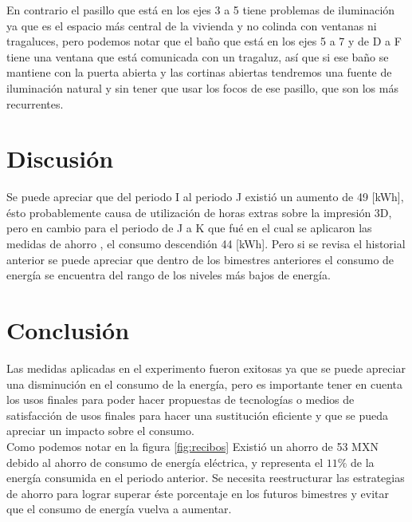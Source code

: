 \documentclass[]{article}
\begin{document}
En contrario el pasillo que está en los ejes 3 a 5 tiene problemas de iluminación ya que es el espacio más central de la vivienda y no colinda con ventanas ni tragaluces, pero podemos notar que el baño que está en los ejes 5 a 7 y de D a F tiene una ventana que está comunicada con un tragaluz, así que si ese baño se mantiene con la puerta abierta y las cortinas abiertas tendremos una fuente de iluminación natural y sin tener que usar los focos de ese pasillo, que son los más recurrentes.\\

\section{Discusión}


Se puede apreciar que del periodo I al periodo J existió un aumento  de 49 [kWh], ésto probablemente causa de utilización de horas extras sobre la impresión 3D, pero en cambio para el periodo de J a K que fué en el cual se aplicaron las medidas de ahorro , el consumo descendión 44 [kWh]. Pero si se revisa el historial anterior se puede apreciar que dentro de los bimestres anteriores el consumo de energía se encuentra del rango de los niveles más bajos de energía.\\

\section{Conclusión}

Las medidas aplicadas en el experimento fueron exitosas ya que se puede apreciar una disminución en el consumo de la energía, pero es importante tener en cuenta los usos finales para poder hacer propuestas de tecnologías o medios de satisfacción de usos finales para hacer una sustitución eficiente y que se pueda apreciar un impacto sobre el consumo.\\

Como podemos notar en la figura \ref{fig:recibos} Existió un ahorro de 53 MXN debido al ahorro de consumo de energía eléctrica, y representa el $11\%$ de la energía consumida en el periodo anterior. Se necesita reestructurar las estrategias de ahorro para lograr superar éste porcentaje en los futuros bimestres y evitar que el consumo de energía vuelva a aumentar.\\
\end{document}

